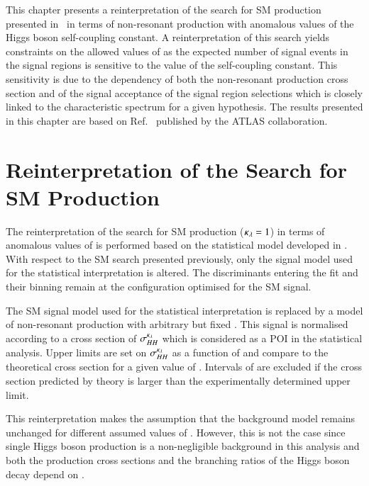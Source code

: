 This chapter presents a reinterpretation of the search for SM \HH
production presented in~ in terms of non-resonant
\HH production with anomalous values of the Higgs boson self-coupling
constant. A reinterpretation of this search yields constraints on the
allowed values of \klambda as the expected number of signal events in
the signal regions is sensitive to the value of the self-coupling
constant. This sensitivity is due to the \klambda dependency of both
the non-resonant \HH production cross section and of the signal
acceptance of the signal region selections which is closely linked to
the characteristic \mHH spectrum for a given \klambda hypothesis. The
results presented in this chapter are based on
Ref.~\cite{ATLAS-CONF-2021-052} published by the ATLAS collaboration.


\section{Reinterpretation of the Search for SM \HH Production}%
\label{sec:reinterpretation}

The reinterpretation of the search for SM \HH production
($\kappa_{\lambda} = 1$) in terms of anomalous values of \klambda is performed
based on the statistical model developed in
. With respect to the SM \HH search
presented previously, only the signal model used for the statistical
interpretation is altered. The discriminants entering the fit and
their binning remain at the configuration optimised for the SM \HH
signal.

The SM \HH signal model used for the statistical interpretation is
replaced by a model of non-resonant \HH production with arbitrary but
fixed \klambda. This signal is normalised according to a cross section
of $\sigma_{HH}^{\kappa_{\lambda}}$ which is considered as a POI in the
statistical analysis. Upper limits are set on $\sigma_{HH}^{\kappa_{\lambda}}$
as a function of \klambda and compare to the theoretical cross section
for a given value of \klambda. Intervals of \klambda are excluded if
the cross section predicted by theory is larger than the
experimentally determined upper limit.

This reinterpretation makes the assumption that the background model
remains unchanged for different assumed values of \klambda. However,
this is not the case since single Higgs boson production is a
non-negligible background in this analysis and both the production
cross sections and the branching ratios of the Higgs boson decay
depend on \klambda.


